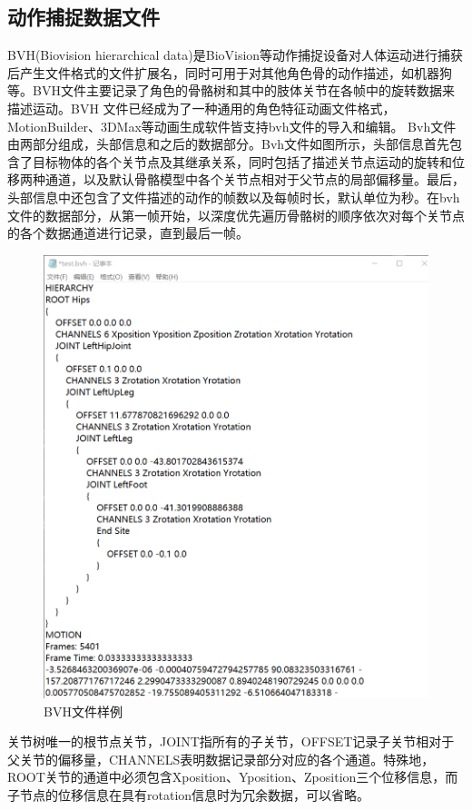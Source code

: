 \subsection{动作捕捉数据文件}{}
BVH(Biovision hierarchical data)是BioVision等动作捕捉设备对人体运动进行捕获后产生文件格式的文件扩展名，同时可用于对其他角色骨的动作描述，如机器狗等。BVH文件主要记录了角色的骨骼树和其中的肢体关节在各帧中的旋转数据来描述运动。BVH 文件已经成为了一种通用的角色特征动画文件格式，MotionBuilder、3DMax等动画生成软件皆支持bvh文件的导入和编辑。
Bvh文件由两部分组成，头部信息和之后的数据部分。Bvh文件如图所示，头部信息首先包含了目标物体的各个关节点及其继承关系，同时包括了描述关节点运动的旋转和位移两种通道，以及默认骨骼模型中各个关节点相对于父节点的局部偏移量。最后，头部信息中还包含了文件描述的动作的帧数以及每帧时长，默认单位为秒。在bvh文件的数据部分，从第一帧开始，以深度优先遍历骨骼树的顺序依次对每个关节点的各个数据通道进行记录，直到最后一帧。
\begin{figure}[h]
	\centering
	\includegraphics[scale=0.4]{figures/15.png}
	\caption{BVH文件样例}
	\label{fig:f15}
\end{figure}
关节树唯一的根节点关节，JOINT指所有的子关节，OFFSET记录子关节相对于父关节的偏移量，CHANNELS表明数据记录部分对应的各个通道。特殊地，ROOT关节的通道中必须包含Xposition、Yposition、Zposition三个位移信息，而子节点的位移信息在具有rotation信息时为冗余数据，可以省略。

